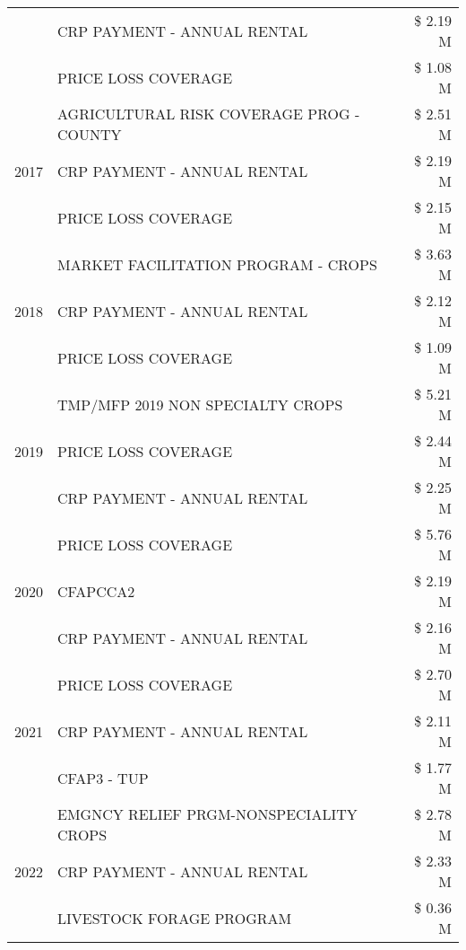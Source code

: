 \begin{tabular}{llr}
 & CRP PAYMENT - ANNUAL RENTAL & \$ 2.19 M \\
 & PRICE LOSS COVERAGE & \$ 1.08 M \\
\cline{1-3}
\multirow[t]{3}{*}{2017} & AGRICULTURAL RISK COVERAGE PROG - COUNTY & \$ 2.51 M \\
 & CRP PAYMENT - ANNUAL RENTAL & \$ 2.19 M \\
 & PRICE LOSS COVERAGE & \$ 2.15 M \\
\cline{1-3}
\multirow[t]{3}{*}{2018} & MARKET FACILITATION PROGRAM - CROPS & \$ 3.63 M \\
 & CRP PAYMENT - ANNUAL RENTAL & \$ 2.12 M \\
 & PRICE LOSS COVERAGE & \$ 1.09 M \\
\cline{1-3}
\multirow[t]{3}{*}{2019} & TMP/MFP 2019 NON SPECIALTY CROPS & \$ 5.21 M \\
 & PRICE LOSS COVERAGE & \$ 2.44 M \\
 & CRP PAYMENT - ANNUAL RENTAL & \$ 2.25 M \\
\cline{1-3}
\multirow[t]{3}{*}{2020} & PRICE LOSS COVERAGE & \$ 5.76 M \\
 & CFAPCCA2 & \$ 2.19 M \\
 & CRP PAYMENT - ANNUAL RENTAL & \$ 2.16 M \\
\cline{1-3}
\multirow[t]{3}{*}{2021} & PRICE LOSS COVERAGE & \$ 2.70 M \\
 & CRP PAYMENT - ANNUAL RENTAL & \$ 2.11 M \\
 & CFAP3 - TUP & \$ 1.77 M \\
\cline{1-3}
\multirow[t]{3}{*}{2022} & EMGNCY RELIEF PRGM-NONSPECIALITY CROPS & \$ 2.78 M \\
 & CRP PAYMENT - ANNUAL RENTAL & \$ 2.33 M \\
 & LIVESTOCK FORAGE PROGRAM & \$ 0.36 M \\
\cline{1-3}
\bottomrule
\end{tabular}
